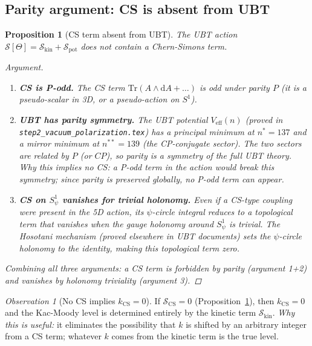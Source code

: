\documentclass[11pt,a4paper]{article}
\newtheorem{proposition}{Proposition}
\theoremstyle{definition}
\theoremstyle{remark}
\newtheorem{observation}{Observation}
\begin{document}
\subsection{Parity argument: CS is absent from UBT}

\begin{proposition}[CS term absent from UBT]
  \label{prop:no_CS}
  The UBT action $\mathcal{S}[\Theta] = \mathcal{S}_{\mathrm{kin}} + \mathcal{S}_{\mathrm{pot}}$
  does not contain a Chern-Simons term.
  \begin{proof}[Argument]
    \begin{enumerate}
      \item \textbf{CS is P-odd.}
        The CS term $\mathrm{Tr}(A \wedge \mathrm{d}A + \ldots)$ is
        odd under parity $P$ (it is a pseudo-scalar in 3D, or a
        pseudo-action on $S^1$).
      \item \textbf{UBT has parity symmetry.}
        The UBT potential $V_{\mathrm{eff}}(n)$ (proved in
        \texttt{step2\_vacuum\_polarization.tex}) has a principal
        minimum at $n^* = 137$ and a mirror minimum at $n^{**} = 139$
        (the CP-conjugate sector).
        The two sectors are related by $P$ (or $CP$), so parity is a
        symmetry of the full UBT theory.
        \textit{Why this implies no CS: a P-odd term in the action
        would break this symmetry; since parity is preserved globally,
        no P-odd term can appear.}
      \item \textbf{CS on $S^1_\psi$ vanishes for trivial holonomy.}
        Even if a CS-type coupling were present in the 5D action,
        its $\psi$-circle integral reduces to a topological term that
        vanishes when the gauge holonomy around $S^1_\psi$ is trivial.
        The Hosotani mechanism (proved elsewhere in UBT documents) sets
        the $\psi$-circle holonomy to the identity, making this
        topological term zero.
    \end{enumerate}
    Combining all three arguments: a CS term is forbidden by parity
    (argument 1+2) and vanishes by holonomy triviality (argument 3).
  \end{proof}
\end{proposition}

\begin{observation}[No CS implies $k_{\mathrm{CS}} = 0$]
  \label{obs:no_CS_kCS0}
  If $\mathcal{S}_{\mathrm{CS}} = 0$ (Proposition~\ref{prop:no_CS}),
  then $k_{\mathrm{CS}} = 0$ and the Kac-Moody level is determined
  entirely by the kinetic term $\mathcal{S}_{\mathrm{kin}}$.
  \textit{Why this is useful:} it eliminates the possibility that $k$
  is shifted by an arbitrary integer from a CS term; whatever $k$
  comes from the kinetic term is the true level.
\end{observation}
\end{document}
